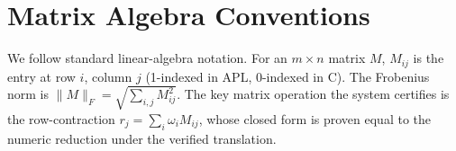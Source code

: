 \section{Matrix Algebra Conventions}
\label{sec:prelim-mat}

We follow standard linear-algebra notation. For an $m\times n$ matrix
$M$, $M_{ij}$ is the entry at row $i$, column $j$ (1-indexed in APL,
0-indexed in C). The Frobenius norm is
$\|M\|_F = \sqrt{\sum_{i,j} M_{ij}^2}$. The key matrix operation the
system certifies is the row-contraction
$r_j = \sum_i \omega_i M_{ij}$, whose closed form is proven equal to the
numeric reduction under the verified translation.
